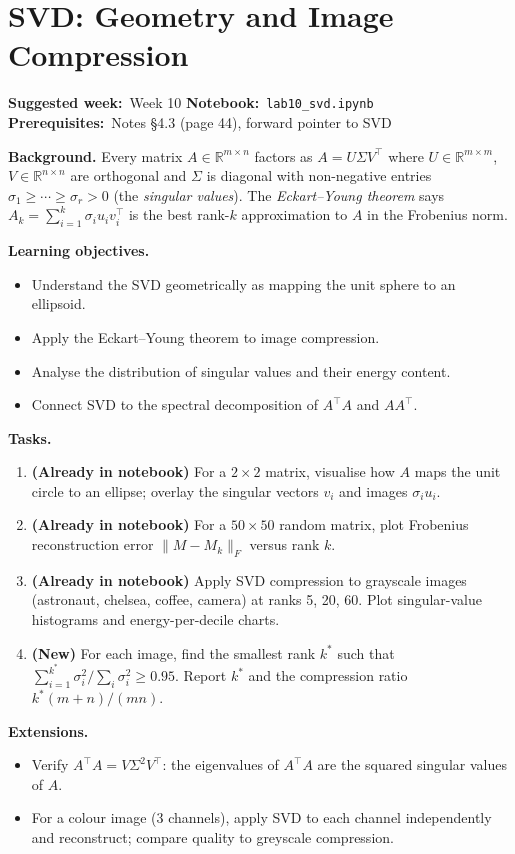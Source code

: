 \documentclass[11pt, a4paper]{article}
\newcommand{\labmeta}[3]{%
  \begin{prereqbox}
  \textbf{Suggested week:}~#1 \quad
  \textbf{Notebook:}~\texttt{#2} \quad
  \textbf{Prerequisites:}~#3
  \end{prereqbox}
  \vspace{4pt}
}
\newcommand{\objectives}[1]{%
  \textbf{\color{prereqcolor}Learning objectives.}\vspace{2pt}
  \begin{itemize}[leftmargin=1.6em, itemsep=1pt] #1 \end{itemize}
}
\newcommand{\tasks}[1]{%
  \begin{taskbox}
  \textbf{\color{taskcolor}Tasks.}
  \begin{enumerate}[leftmargin=1.6em, itemsep=3pt] #1 \end{enumerate}
  \end{taskbox}
}
\newcommand{\extensions}[1]{%
  \textbf{\color{notecolor}Extensions.}
  \begin{itemize}[leftmargin=1.6em, itemsep=1pt] #1 \end{itemize}
}
\begin{document}
\section{SVD: Geometry and Image Compression}
\label{lab:svd}

\labmeta{Week 10}{lab10\_svd.ipynb}{Notes §4.3 (page 44), forward pointer to SVD}

\vspace{4pt}

\noindent\textbf{Background.}
Every matrix $A \in \mathbb{R}^{m\times n}$ factors as $A = U\Sigma V^\top$
where $U \in \mathbb{R}^{m\times m}$, $V \in \mathbb{R}^{n\times n}$ are
orthogonal and $\Sigma$ is diagonal with non-negative entries
$\sigma_1 \geq \cdots \geq \sigma_r > 0$ (the \emph{singular values}).
The \emph{Eckart--Young theorem} says $A_k = \sum_{i=1}^k \sigma_i u_i v_i^\top$
is the best rank-$k$ approximation to $A$ in the Frobenius norm.

\objectives{
  \item Understand the SVD geometrically as mapping the unit sphere to an ellipsoid.
  \item Apply the Eckart--Young theorem to image compression.
  \item Analyse the distribution of singular values and their energy content.
  \item Connect SVD to the spectral decomposition of $A^\top A$ and $AA^\top$.
}

\tasks{
  \item \textbf{(Already in notebook)} For a $2\times 2$ matrix, visualise how
        $A$ maps the unit circle to an ellipse; overlay the singular vectors $v_i$
        and images $\sigma_i u_i$.
  \item \textbf{(Already in notebook)} For a $50\times 50$ random matrix, plot
        Frobenius reconstruction error $\|M - M_k\|_F$ versus rank $k$.
  \item \textbf{(Already in notebook)} Apply SVD compression to grayscale images
        (astronaut, chelsea, coffee, camera) at ranks 5, 20, 60.
        Plot singular-value histograms and energy-per-decile charts.
  \item \textbf{(New)} For each image, find the smallest rank $k^*$ such that
        $\sum_{i=1}^{k^*}\sigma_i^2 / \sum_i \sigma_i^2 \geq 0.95$.
        Report $k^*$ and the compression ratio $k^*(m+n)/(mn)$.
}

\extensions{
  \item Verify $A^\top A = V\Sigma^2 V^\top$: the eigenvalues of $A^\top A$ are
        the squared singular values of $A$.
  \item For a colour image (3 channels), apply SVD to each channel independently
        and reconstruct; compare quality to greyscale compression.
}
\end{document}
